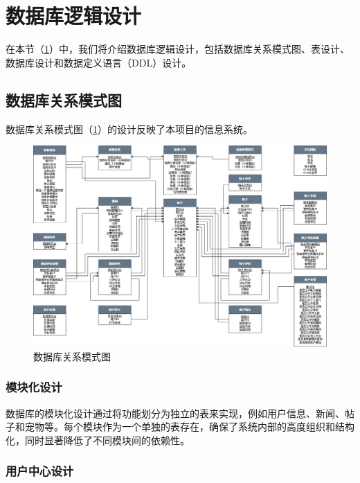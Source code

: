 \section{数据库逻辑设计}\label{sec:LogicalDesign}

在本节（\cref{sec:LogicalDesign}）中，我们将介绍数据库逻辑设计，包括数据库关系模式图、表设计、数据库设计和数据定义语言（DDL）设计。

\subsection{数据库关系模式图}

数据库关系模式图（\cref{fig:RelationshipSchema}）的设计反映了本项目的信息系统。

\begin{figure}[htbp]
    \centering
    \includegraphics[width=\textwidth]{figures/RelationshipSchema.png}
    \caption{数据库关系模式图}
    \label{fig:RelationshipSchema}
\end{figure}

\subsubsection{模块化设计}

数据库的模块化设计通过将功能划分为独立的表来实现，例如用户信息、新闻、帖子和宠物等。每个模块作为一个单独的表存在，确保了系统内部的高度组织和结构化，同时显著降低了不同模块间的依赖性。

\subsubsection{用户中心设计}

